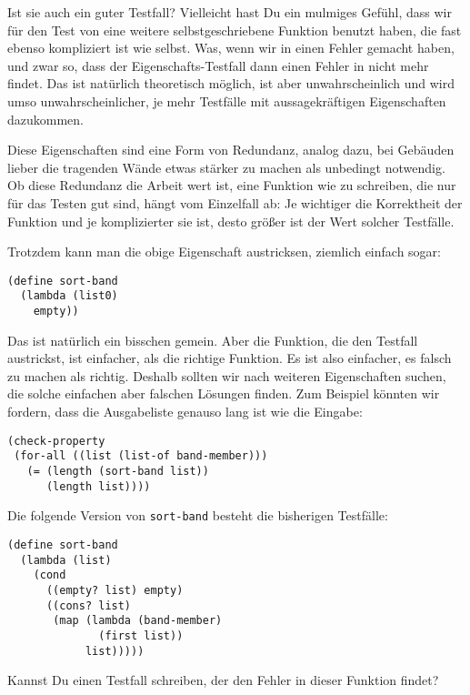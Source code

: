 Ist sie auch ein guter Testfall?  Vielleicht hast Du ein mulmiges
Gefühl, dass wir für den Test von  eine weitere
selbstgeschriebene Funktion benutzt haben, die fast ebenso kompliziert
ist wie  selbst.  Was, wenn wir in
 einen Fehler gemacht haben, und zwar so,
dass der Eigenschafts-Testfall dann einen Fehler in
 nicht mehr findet.  Das ist natürlich
theoretisch möglich, ist aber unwahrscheinlich und wird umso
unwahrscheinlicher, je mehr Testfälle mit aussagekräftigen
Eigenschaften dazukommen.

Diese Eigenschaften sind eine Form von Redundanz,
analog dazu, bei Gebäuden lieber die tragenden Wände etwas stärker zu
machen als unbedingt notwendig.  Ob diese Redundanz die Arbeit wert
ist, eine Funktion wie  zu schreiben, die nur
für das Testen gut sind, hängt vom Einzelfall ab: Je wichtiger die
Korrektheit der Funktion und je komplizierter sie ist, desto größer
ist der Wert solcher Testfälle.

Trotzdem kann man die obige Eigenschaft austricksen, ziemlich einfach
sogar:
%
\begin{lstlisting}
(define sort-band
  (lambda (list0)
    empty))
\end{lstlisting}
%
Das ist natürlich ein bisschen gemein.  Aber die Funktion, die den
Testfall austrickst, ist einfacher, als die richtige Funktion.  Es ist
also einfacher, es falsch zu machen als richtig.  Deshalb sollten wir
nach weiteren Eigenschaften suchen, die solche einfachen aber falschen
Lösungen finden.  Zum Beispiel könnten wir fordern, dass die
Ausgabeliste genauso lang ist wie die Eingabe:
%
\begin{lstlisting}
(check-property
 (for-all ((list (list-of band-member)))
   (= (length (sort-band list))
      (length list))))
\end{lstlisting}
%
\begin{aufgabeinline}
  Die folgende Version von \lstinline{sort-band} besteht die
  bisherigen Testfälle:
\begin{lstlisting}
(define sort-band
  (lambda (list)
    (cond
      ((empty? list) empty)
      ((cons? list)
       (map (lambda (band-member)
              (first list))
            list)))))
\end{lstlisting}
  Kannst Du einen Testfall schreiben, der den Fehler in dieser
  Funktion findet?
\end{aufgabeinline}

